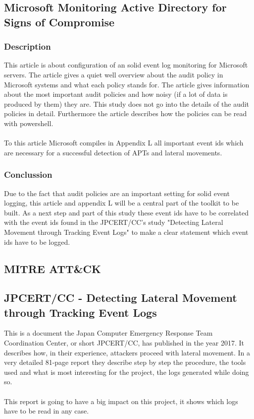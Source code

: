 \subsection{Microsoft Monitoring Active Directory for Signs of Compromise
}
\subsubsection{Description}
This article \cite{MSADSignsOfCompromise} is about configuration of an solid event log monitoring for Microsoft servers. The article gives a quiet well overview about the audit policy in Microsoft systems and what each policy stands for. The article gives information about the most important audit policies and how noisy (if a lot of data is produced by them) they are. This study does not go into the details of the audit policies in detail. Furthermore the article describes how the policies can be read with powershell.
\\\\
To this article Microsoft compiles in Appendix L \cite{MSAppendixL} all important event ids which are necessary for a successful detection of APTs and lateral movements.

\subsubsection{Conclussion}
Due to the fact that audit policies are an important setting for solid event logging, this article and appendix L will be a central part of the toolkit to be built. As a next step and part of this study these event ids have to be correlated with the event ids found in the JPCERT/CC's study "Detecting Lateral Movement through Tracking Event Logs" \cite{JPCERTDetectingLateralMovement} to make a clear statement which event ids have to be logged.

\subsection{MITRE ATT\&CK}

\subsection{JPCERT/CC - Detecting Lateral Movement through Tracking Event Logs}
This is a document the Japan Computer Emergency Response Team Coordination Center, or short JPCERT/CC, has published in the year 2017. It describes how, in their experience, attackers proceed with lateral movement. In a very detailed 81-page report they describe step by step the procedure, the tools used and what is most interesting for the project, the logs generated while doing so.
\\\\
This report is going to have a big impact on this project, it shows which logs have to be read in any case.


